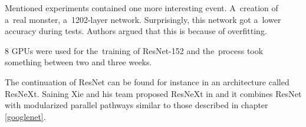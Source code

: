 Mentioned experiments contained one more interesting event. A~creation of
a~real monster, a~1202-layer network. Surprisingly, this network got a~lower
accuracy during tests. Authors argued that this is because of overfitting.

8 GPUs were used for the~training of ResNet-152 and the~process took something 
between two and three weeks.

The continuation of ResNet can be found for instance in an architecture called 
ResNeXt. Saining Xie and his team proposed ResNeXt in \cite{resnext} and it 
combines ResNet with modularized parallel pathways similar to those described
in chapter \ref{googlenet}.


